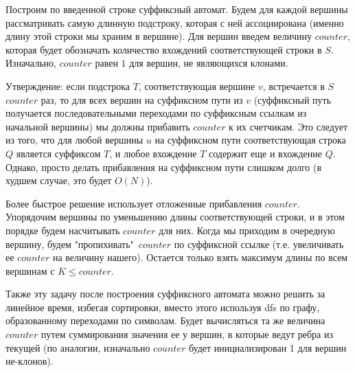 \documentclass{article}
\begin{document}
Построим по введенной строке суффиксный автомат.
Будем для каждой вершины рассматривать самую длинную подстроку, которая с ней ассоциирована (именно длину этой строки мы храним
в вершине).
Для вершин введем величину $counter$, которая будет обозначать количество вхождений соответствующей строки в $S$.
Изначально, $counter$ равен $1$ для вершин, не являющихся клонами.

Утверждение: если подстрока $T$, соответствующая вершине $v$, встречается в $S$ $counter$ раз, то для всех вершин на суффиксном пути из $v$
(суффиксный путь получается последовательными переходами по суффиксным ссылкам из начальной вершины)
мы должны прибавить $counter$ к их счетчикам. Это следует из того, что для любой вершины $u$ на суффиксном пути
соответствующая строка $Q$ является суффиксом $T$, и любое вхождение $T$ содержит еще и вхождение $Q$.
Однако, просто делать прибавления на суффиксном пути слишком долго (в худшем случае, это будет $O(N)$).

Более быстрое решение использует отложенные прибавления $counter$.
Упорядочим вершины по уменьшению длины соответствующей строки, и в этом порядке будем насчитывать $counter$ для них.
Когда мы приходим в очередную вершину, будем "пропихивать"\   $counter$ по суффиксной ссылке
(т.е. увеличивать ее $counter$ на величину нашего).
Остается только взять максимум длины по всем вершинам с $K \leqslant counter$.

Также эту задачу после построения суффиксного автомата можно решить за линейное время, избегая сортировки, вместо этого используя dfs
по графу, образованному переходами по символам.
Будет вычисляться та же величина $counter$ путем суммирования значения ее у вершин, в которые ведут ребра из текущей 
(по аналогии, изначально $counter$ будет инициализирован 1 для вершин не-клонов).
\end{document}
